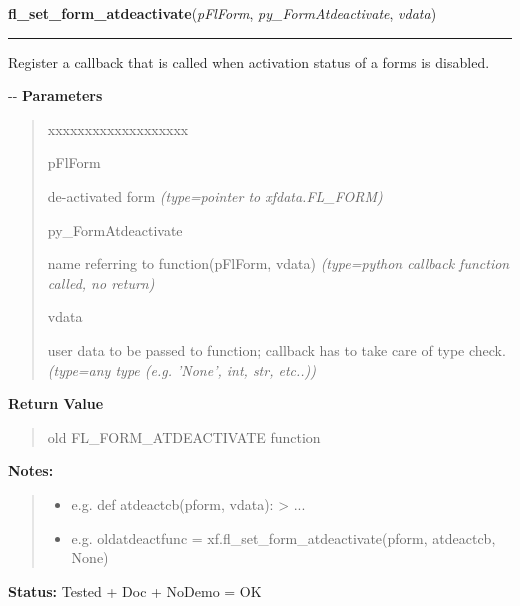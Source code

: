 \hspace{.8\funcindent}\begin{boxedminipage}{\funcwidth}

    \raggedright \textbf{fl\_set\_form\_atdeactivate}(\textit{pFlForm}, \textit{py\_FormAtdeactivate}, \textit{vdata})

    \vspace{-1.5ex}

    \rule{\textwidth}{0.5\fboxrule}
\setlength{\parskip}{2ex}

Register a callback that is called when activation status of a forms
is disabled.

-{}-
\setlength{\parskip}{1ex}
      \textbf{Parameters}
      \vspace{-1ex}

      \begin{quote}
        \begin{Ventry}{xxxxxxxxxxxxxxxxxxx}

          \item[pFlForm]


de-activated form
            {\it (type=pointer to xfdata.FL\_FORM)}

          \item[py\_FormAtdeactivate]


name referring to function(pFlForm, vdata)
            {\it (type=python callback function called, no return)}

          \item[vdata]


user data to be passed to function; callback has to take care of
type check.
            {\it (type=any type (e.g. 'None', int, str, etc..))}

        \end{Ventry}

      \end{quote}

      \textbf{Return Value}
    \vspace{-1ex}

      \begin{quote}

old FL\_FORM\_ATDEACTIVATE function
      \end{quote}

\textbf{Notes:}
\begin{quote}
  \begin{itemize}

  \item
    \setlength{\parskip}{0.6ex}

e.g. def atdeactcb(pform, vdata): > ...


  \item 
e.g. oldatdeactfunc = xf.fl\_set\_form\_atdeactivate(pform,
atdeactcb, None)


\end{itemize}

\end{quote}

\textbf{Status:} 
Tested + Doc + NoDemo = OK


    \end{boxedminipage}

